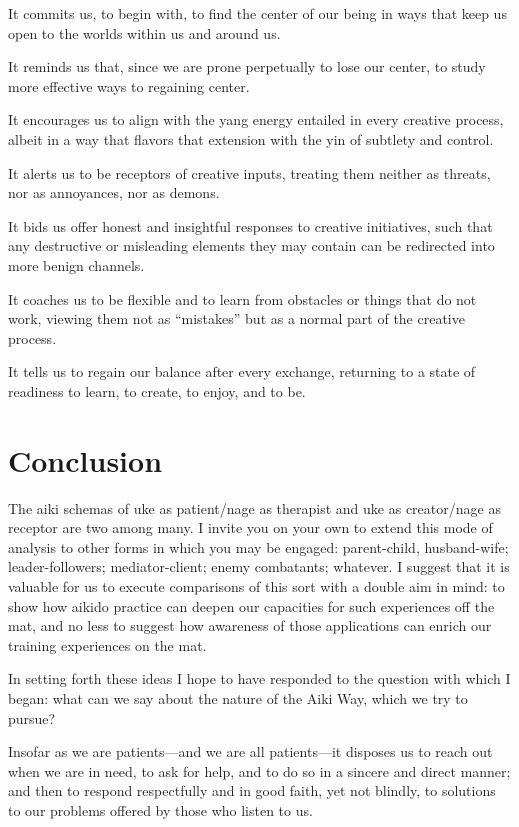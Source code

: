 It commits us, to begin with, to find the center of our being in ways that keep us open to the worlds within us and around us. 

It reminds us that, since we are prone perpetually to lose our center, to study more effective ways to regaining center.

It encourages us to align with the yang energy entailed in every creative process, albeit in a way that flavors that extension with the yin of subtlety and control.

It alerts us to be receptors of creative inputs, treating them neither as threats, nor as annoyances, nor as demons.

It bids us offer honest and insightful responses to creative initiatives, such that any destructive or misleading elements they may contain can be redirected into more benign channels. 

It coaches us to be flexible and to learn from obstacles or things that do not work, viewing them not as ``mistakes'' but as a normal part of the creative process.

It tells us to regain our balance after every exchange, returning to a state of readiness to learn, to create, to enjoy, and to be. 

\section*{Conclusion}

The aiki schemas of uke as patient/nage as therapist and uke as creator/nage as receptor are two among many.  I invite you on your own to extend this mode of analysis to other forms in which you may be engaged: parent-child, husband-wife; leader-followers; mediator-client; enemy combatants; whatever. I suggest that it is valuable for us to execute comparisons of this sort with a double aim in mind: to show how aikido practice can deepen our capacities for such experiences off the mat, and no less to suggest how awareness of those applications can enrich our training experiences on the mat.

In setting forth these ideas I hope to have responded to the question with which I began: what can we say about the nature of the Aiki Way, which we try to pursue?

Insofar as we are patients---and we are all patients---it disposes us to reach out when we are in need, to ask for help, and to do so in a sincere and direct manner; and then to respond respectfully and in good faith, yet not blindly, to solutions to our problems offered by those who listen to us. 

